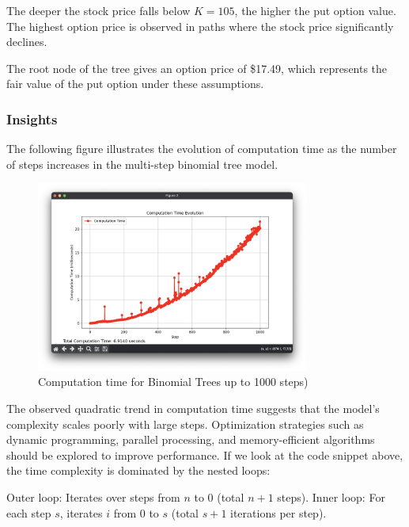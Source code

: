 \documentclass{article}
\begin{document}
    \medskip

    The deeper the stock price falls below \( K = 105 \), the higher the put option value. The highest option price is observed in paths where the stock price significantly declines.

    The root node of the tree gives an option price of \$17.49, which represents the fair value of the put option under these assumptions.

    \subsubsection{Insights}


    The following figure illustrates the evolution of computation time as the number of steps increases in the multi-step binomial tree model.

    \begin{figure}[h]
        \centering
        \includegraphics[width=0.8\textwidth]{ComputationTime_BinTree_v1}
        \caption{Computation time for Binomial Trees up to 1000 steps)}
        \label{fig:computation_time_bintree_v1}
    \end{figure}

    The observed quadratic trend in computation time suggests that the model’s complexity scales poorly with large steps. Optimization strategies such as dynamic programming, parallel processing, and memory-efficient algorithms should be explored to improve performance.
    If we look at the code snippet above, the time complexity is dominated by the nested loops:

    \bigbreak

    Outer loop: Iterates over steps from \( n \) to \( 0 \) (total \( n + 1 \) steps).
    Inner loop: For each step \( s \), iterates \( i \) from \( 0 \) to \( s \) (total \( s + 1 \) iterations per step).
\end{document}
